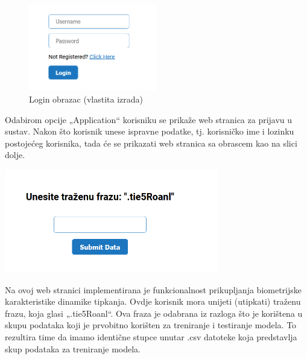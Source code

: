 \documentclass[]{foi}
\begin{document}
\begin{figure}[!h]
    \centering
    \includegraphics[width=0.5\textwidth]{slike/app_login.png}
    \caption{Login obrazac (vlastita izrada)}
    \label{fig:app-login}
\end{figure}

Odabirom opcije „Application“ korisniku se prikaže web stranica za prijavu u sustav. Nakon što korisnik unese ispravne podatke, tj. korisničko ime i lozinku postojećeg korisnika, tada će se prikazati web stranica sa obrascem kao na slici dolje.

\begin{center}
    \includegraphics[width=0.7\textwidth]{slike/app_tipkanje_login.png}
    \label{fig:app-tipkanje-login}
\end{center}


Na ovoj web stranici implementirana je funkcionalnost prikupljanja biometrijske karakteristike dinamike tipkanja. Ovdje korisnik mora unijeti (utipkati) traženu frazu, koja glasi „.tie5Roanl“. Ova fraza je odabrana iz razloga što je korištena u skupu podataka koji je prvobitno korišten za treniranje i testiranje modela. To rezultira time da imamo identične stupce unutar .csv datoteke koja predstavlja skup podataka za treniranje modela.
\end{document}
